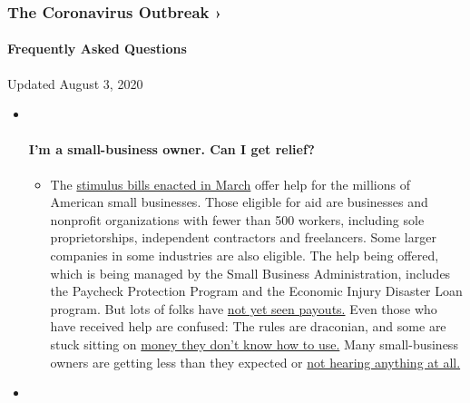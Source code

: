 \hypertarget{the-coronavirus-outbreak-}{%
\subsubsection{The Coronavirus Outbreak
›}\label{the-coronavirus-outbreak-}}

\hypertarget{frequently-asked-questions}{%
\paragraph{Frequently Asked
Questions}\label{frequently-asked-questions}}

Updated August 3, 2020

\begin{itemize}
\item ~
  \hypertarget{im-a-small-business-owner-can-i-get-relief}{%
  \paragraph{I'm a small-business owner. Can I get
  relief?}\label{im-a-small-business-owner-can-i-get-relief}}

  \begin{itemize}
  \tightlist
  \item
    The
    \href{https://www.nytimes.com/article/small-business-loans-stimulus-grants-freelancers-coronavirus.html?action=click\&pgtype=Article\&state=default\&region=MAIN_CONTENT_3\&context=storylines_faq}{stimulus
    bills enacted in March} offer help for the millions of American
    small businesses. Those eligible for aid are businesses and
    nonprofit organizations with fewer than 500 workers, including sole
    proprietorships, independent contractors and freelancers. Some
    larger companies in some industries are also eligible. The help
    being offered, which is being managed by the Small Business
    Administration, includes the Paycheck Protection Program and the
    Economic Injury Disaster Loan program. But lots of folks have
    \href{https://www.nytimes.com/interactive/2020/05/07/business/small-business-loans-coronavirus.html?action=click\&pgtype=Article\&state=default\&region=MAIN_CONTENT_3\&context=storylines_faq}{not
    yet seen payouts.} Even those who have received help are confused:
    The rules are draconian, and some are stuck sitting on
    \href{https://www.nytimes.com/2020/05/02/business/economy/loans-coronavirus-small-business.html?action=click\&pgtype=Article\&state=default\&region=MAIN_CONTENT_3\&context=storylines_faq}{money
    they don't know how to use.} Many small-business owners are getting
    less than they expected or
    \href{https://www.nytimes.com/2020/06/10/business/Small-business-loans-ppp.html?action=click\&pgtype=Article\&state=default\&region=MAIN_CONTENT_3\&context=storylines_faq}{not
    hearing anything at all.}
  \end{itemize}
\item ~
  \hypertarget{what-are-my-rights-if-i-am-worried-about-going-back-to-work}{%
}
\end{itemize}
